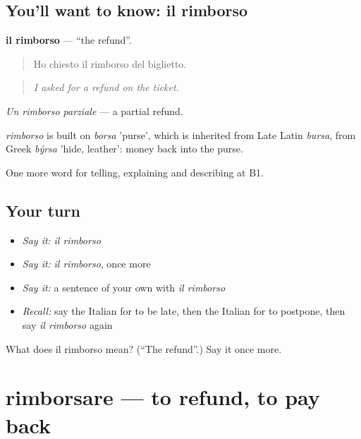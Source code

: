 \subsection*{You'll want to know: il rimborso}
\textbf{il rimborso} — \textquotedblleft{}the refund\textquotedblright{}.

\begin{quote}
Ho chiesto il rimborso del biglietto.
\end{quote}

\begin{quote}
\emph{I asked for a refund on the ticket.}
\end{quote}

\emph{Un rimborso parziale} — a partial refund.

\begin{cousinweb}
\emph{rimborso} is built on \emph{borsa} 'purse', which is inherited from Late Latin \emph{bursa}, from Greek \emph{býrsa} 'hide, leather': money back into the purse.
\end{cousinweb}

\begin{grammarlens}[title={What you've built}]
One more word for telling, explaining and describing at B1.
\end{grammarlens}

\subsection*{Your turn}
\begin{itemize}
\raggedright
  \item \emph{Say it:} \emph{il rimborso}
  \item \emph{Say it:} \emph{il rimborso}, once more
  \item \emph{Say it:} a sentence of your own with \emph{il rimborso}
  \item \emph{Recall:} say the Italian for to be late, then the Italian for to postpone, then say \emph{il rimborso} again
\end{itemize}

\begin{tcolorbox}[breakable,colback=teal!4,colframe=teal!35!black,title={Before you move on}]
What does il rimborso mean? (\textquotedblleft{}The refund\textquotedblright{}.) Say it once more.
\end{tcolorbox}
\section[rimborsare]{rimborsare — to refund, to pay back}

